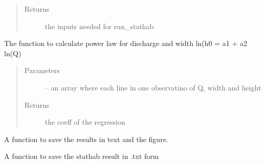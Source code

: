 \documentclass[letterpaper,10pt,english]{sphinxmanual}
\begin{document}
\begin{fulllineitems}
\begin{fulllineitems}
\begin{quote}
\begin{description}
\begin{itemize}
\end{itemize}

\item[{Returns}] \leavevmode
the inputs needed for run\_stathab

\end{description}\end{quote}

\end{fulllineitems}


\begin{fulllineitems}
\label{\detokenize{index:src.stathab_c.Stathab.power_law}}
The function to calculate power law for discharge and width
ln(h0 = a1 + a2 ln(Q)
\begin{quote}\begin{description}
\item[{Parameters}] \leavevmode
{} -- an array where each line in one observatino of Q, width and height

\item[{Returns}] \leavevmode
the coeff of the regression

\end{description}\end{quote}

\end{fulllineitems}


\begin{fulllineitems}
\label{\detokenize{index:src.stathab_c.Stathab.savefig_stahab}}
A function to save the results in text and the figure.

\end{fulllineitems}


\begin{fulllineitems}
\label{\detokenize{index:src.stathab_c.Stathab.savetxt_stathab}}
A function to save the stathab result in .txt form

\end{fulllineitems}



\end{fulllineitems}
\end{document}
